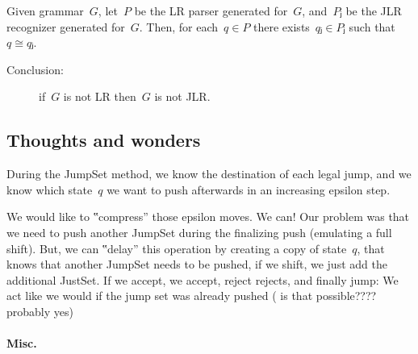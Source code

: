 \begin{Lemma}
  Given grammar~$G$, let~$P$ be the LR parser generated for~$G$, and~$Pⱼ$ be
    the JLR recognizer generated for~$G$.
  Then, for each~$q∈P$ there exists~$qⱼ∈Pⱼ$ such that~$q≅qⱼ$.
\end{Lemma}
\begin{description}
  \item[Conclusion:] if~$G$ is not LR then~$G$ is not JLR.
\end{description}

\subsection{Thoughts and wonders}

During the JumpSet method, we know the destination of each legal jump,
and we know which state~$q$ we want to push afterwards in an increasing epsilon step.

We would like to ‟compress” those epsilon moves. We can!
Our problem was that we need to push another JumpSet during the finalizing push (emulating a full shift).
But, we can ‟delay” this operation by creating a copy of state~$q$, that knows that another JumpSet needs to be
pushed, if we shift, we just add the additional JustSet. If we accept, we accept, reject rejects, and finally jump:
We act like we would if the jump set was already pushed ( is that possible???? probably yes)
\paragraph{Misc.}

\endinput

\subsection{Between LR and JLR - A direct approach}
LR parsers are actually DPDAs\@. As we mentioned before in \cref{section:proof},~$ε$-moves
  fails the emulation of a DPDA, thus, in order to type-encode an LR parser, we first need
  to convert it to the encode-able jDPDA\@.

A \emph{JLR parser}, or \emph{Jump LR Parser} is an LR parser, that
  is based on a variation of the jDPDA\@.
The objective of the JLR parser is refined in~\cref{theorem:JLR}.

\begin{Theorem}
  \label{theorem:JLR}
  Let~$P$ be an LR parser, then there exists a jDPDA~$J$,
  such that for every string~$α∈Σ^*$, parser~$P$ accepts~$α$
    if and only if~$J$ accepts~$α$
\end{Theorem}


